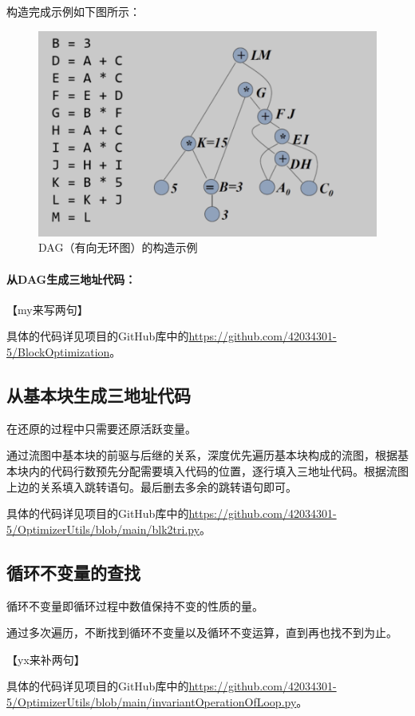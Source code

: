 \documentclass[cn,black,11pt,normal]{elegantnote}
\begin{document}
构造完成示例如下图所示：

\begin{figure}[H]
    \centering
    \includegraphics[width=0.8\linewidth]{image/dagopt1.png}
    \caption{DAG（有向无环图）的构造示例}
\end{figure}

\paragraph{从DAG生成三地址代码：} 【my来写两句】

具体的代码详见项目的GitHub库中的\url{https://github.com/42034301-5/BlockOptimization}。

\subsection{从基本块生成三地址代码}

在还原的过程中只需要还原活跃变量。

通过流图中基本块的前驱与后继的关系，深度优先遍历基本块构成的流图，根据基本块内的代码行数预先分配需要填入代码的位置，逐行填入三地址代码。根据流图上边的关系填入跳转语句。最后删去多余的跳转语句即可。

具体的代码详见项目的GitHub库中的\url{https://github.com/42034301-5/OptimizerUtils/blob/main/blk2tri.py}。

\subsection{循环不变量的查找}

循环不变量即循环过程中数值保持不变的性质的量。

通过多次遍历，不断找到循环不变量以及循环不变运算，直到再也找不到为止。

【yx来补两句】

具体的代码详见项目的GitHub库中的\url{https://github.com/42034301-5/OptimizerUtils/blob/main/invariantOperationOfLoop.py}。
\end{document}
